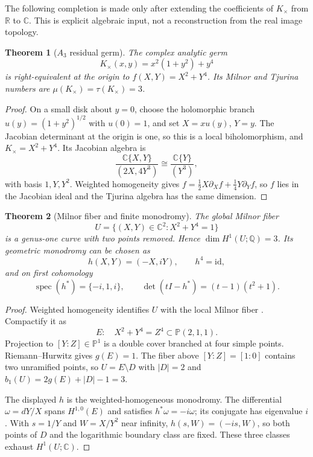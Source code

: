 \documentclass[11pt]{article}
\newtheorem{theorem}{Theorem}[section]
\begin{document}
The following completion is made only after extending the coefficients of
$K_\times$ from $\mathbb R$ to $\mathbb C$.  This is explicit algebraic input,
not a reconstruction from the real image topology.

\begin{theorem}[$A_3$ residual germ]
\label{thm:a3_residual}
The complex analytic germ
\[
 K_\times(x,y)=x^2(1+y^2)+y^4
\]
is right-equivalent at the origin to $f(X,Y)=X^2+Y^4$.  Its Milnor and
Tjurina numbers are $\mu(K_\times)=\tau(K_\times)=3$.
\end{theorem}

\begin{proof}
On a small disk about $y=0$, choose the holomorphic branch
$u(y)=(1+y^2)^{1/2}$ with $u(0)=1$, and set $X=xu(y)$, $Y=y$.
The Jacobian determinant at the origin is one, so this is a local
biholomorphism, and $K_\times=X^2+Y^4$.  Its Jacobian algebra is
\[
 \frac{\mathbb C\{X,Y\}}{(2X,4Y^3)}
 \cong\frac{\mathbb C\{Y\}}{(Y^3)},
\]
with basis $1,Y,Y^2$.  Weighted homogeneity gives
$f=\tfrac12X\partial_Xf+\tfrac14Y\partial_Yf$, so $f$ lies in the Jacobian
ideal and the Tjurina algebra has the same dimension.
\end{proof}

\begin{theorem}[Milnor fiber and finite monodromy]
\label{thm:a3_milnor}
The global Milnor fiber
\[
 U=\{(X,Y)\in\mathbb C^2:X^2+Y^4=1\}
\]
is a genus-one curve with two points removed.  Hence
$\dim H^1(U;\mathbb Q)=3$.  Its geometric monodromy can be chosen as
\[
 h(X,Y)=(-X,iY),\qquad h^4=\mathrm{id},
\]
and on first cohomology
\[
 \operatorname{spec}(h^*)=\{-i,1,i\},\qquad
 \det(tI-h^*)=(t-1)(t^2+1).
\]
\end{theorem}

\begin{proof}
Weighted homogeneity identifies $U$ with the local Milnor fiber
\cite{Milnor1968,Dimca1992}.  Compactify it as
\[
 E:\quad X^2+Y^4=Z^4\subset\mathbb P(2,1,1).
\]
Projection to $[Y:Z]\in\mathbb P^1$ is a double cover branched at four
simple points.  Riemann--Hurwitz gives $g(E)=1$.  The fiber above
$[Y:Z]=[1:0]$ contains two unramified points, so $U=E\setminus D$ with
$|D|=2$ and $b_1(U)=2g(E)+|D|-1=3$.

The displayed $h$ is the weighted-homogeneous monodromy.  The differential
$\omega=dY/X$ spans $H^{1,0}(E)$ and satisfies $h^*\omega=-i\omega$; its
conjugate has eigenvalue $i$.  With $s=1/Y$ and $W=X/Y^2$ near infinity,
$h(s,W)=(-is,W)$, so both points of $D$ and the logarithmic boundary class are
fixed.  These three classes exhaust $H^1(U;\mathbb C)$.
\end{proof}
\end{document}
